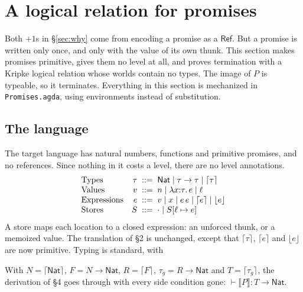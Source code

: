 \documentclass[11pt]{article}
\newcommand{\Nat}{\mathsf{Nat}}
\newcommand{\lam}[2]{\lambda #1{:}#2.\,}
\newcommand{\Prom}[2]{\lceil #2 \rceil^{#1}}
\newcommand{\prom}[1]{\lceil #1 \rceil}
\newcommand{\frc}[1]{\lfloor #1 \rfloor}
\newcommand{\tr}[1]{\llbracket #1 \rrbracket}
\begin{document}
\newpage
\section{A logical relation for promises}
\label{sec:lr}

Both $+1$s in \S\ref{sec:why} come from encoding a promise as a
$\mathsf{Ref}$. But a promise is written only once, and only with the value
of its own thunk. This section makes promises primitive, gives them no level
at all, and proves termination with a Kripke logical relation whose worlds
contain no types. The image of $P$ is typeable, so it terminates.
Everything in this section is mechanized in \texttt{Promises.agda}, using
environments instead of substitution.

\subsection{The language}

The target language has natural numbers, functions and primitive promises,
and no references. Since nothing in it costs a level, there are no level
annotations.
\[
\begin{array}{@{}l@{\quad}r@{\;\;::=\;\;}l@{}}
  \text{Types} & \tau & \Nat \mid \tau \to \tau \mid \Prom{}{\tau} \\
  \text{Values} & v & n \mid \lam{x}{\tau} e \mid \ell \\
  \text{Expressions} & e & v \mid x \mid e\,e \mid \prom{e} \mid \frc{e} \\
  \text{Stores} & S & \cdot \mid S[\ell \mapsto e]
\end{array}
\]
A store maps each location to a closed expression: an unforced thunk, or a
memoized value. The translation of \S2 is unchanged, except that
$\Prom{}{\tau}$, $\prom{e}$ and $\frc{e}$ are now primitive. Typing is
standard, with
With $N = \Prom{}{\Nat}$, $F = N \to \Nat$, $R = \Prom{}{F}$,
$\tau_g = R \to \Nat$ and $T = \Prom{}{\tau_g}$, the derivation of \S4 goes
through with every side condition gone:
$\vdash \tr{P} : T \to \Nat$.
\end{document}
